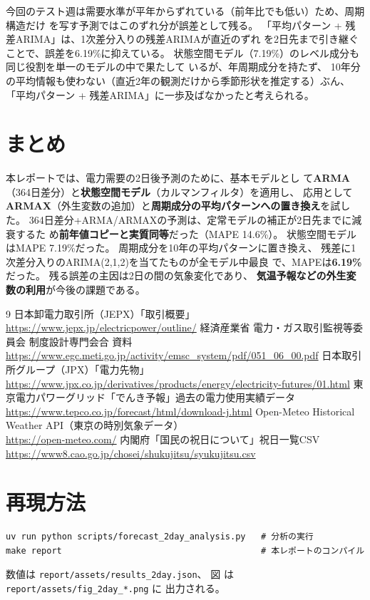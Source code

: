 \documentclass[a4paper,11pt]{ltjsarticle}
\begin{document}
今回のテスト週は需要水準が平年からずれている（前年比でも低い）ため、周期構造だけ
を写す予測ではこのずれ分が誤差として残る。
「平均パターン + 残差ARIMA」は、1次差分入りの残差ARIMAが直近のずれ
を2日先まで引き継ぐことで、誤差を6.19\%に抑えている。
状態空間モデル（7.19\%）のレベル成分も同じ役割を単一のモデルの中で果たして
いるが、年周期成分を持たず、%
10年分の平均情報も使わない（直近2年の観測だけから季節形状を推定する）ぶん、
「平均パターン + 残差ARIMA」に一歩及ばなかったと考えられる。

\section{まとめ}

本レポートでは、電力需要の2日後予測のために、基本モデルとし
て\textbf{ARMA}（364日差分）と\textbf{状態空間モデル}（カルマンフィルタ）を適用し、
応用として\textbf{ARMAX}（外生変数の追加）と\textbf{周期成分の平均パターンへの置き換え}を試した。
364日差分+ARMA/ARMAXの予測は、定常モデルの補正が2日先までに減衰するた
め\textbf{前年値コピーと実質同等}だった（MAPE 14.6\%）。
状態空間モデルはMAPE 7.19\%だった。
周期成分を10年の平均パターンに置き換え、
残差に1次差分入りのARIMA(2,1,2)を当てたものが全モデル中最良
で、MAPEは\textbf{6.19\%}だった。
残る誤差の主因は2日の間の気象変化であり、%
\textbf{気温予報などの外生変数の利用}が今後の課題である。

\renewcommand{\refname}{出典}
\begin{thebibliography}{9}
   日本卸電力取引所（JEPX）「取引概要」\\
    \url{https://www.jepx.jp/electricpower/outline/}
   経済産業省 電力・ガス取引監視等委員会 制度設計専門会合 資料\\
    \url{https://www.egc.meti.go.jp/activity/emsc_system/pdf/051_06_00.pdf}
   日本取引所グループ（JPX）「電力先物」\\
    \url{https://www.jpx.co.jp/derivatives/products/energy/electricity-futures/01.html}
   東京電力パワーグリッド「でんき予報」過去の電力使用実績データ\\
    \url{https://www.tepco.co.jp/forecast/html/download-j.html}
   Open-Meteo Historical Weather API（東京の時別気象データ）\\
    \url{https://open-meteo.com/}
   内閣府「国民の祝日について」祝日一覧CSV\\
    \url{https://www8.cao.go.jp/chosei/shukujitsu/syukujitsu.csv}
\end{thebibliography}

\section*{再現方法}

\begin{verbatim}
uv run python scripts/forecast_2day_analysis.py   # 分析の実行
make report                                       # 本レポートのコンパイル
\end{verbatim}

数値は \texttt{report/assets/results\_2day.json}、
図
は \texttt{report/assets/fig\_2day\_*.png} に
出力される。
\end{document}
